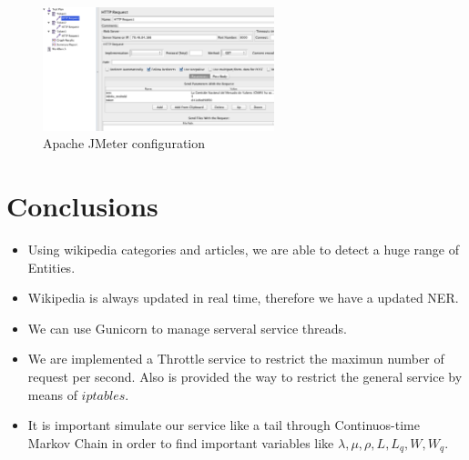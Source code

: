 \documentclass[a4paper,11pt]{article}
\begin{document}
\begin{figure}[htb]
\begin{center}
\includegraphics[width=0.6\textwidth]{img/jmeter_conf.pdf}
\caption{Apache JMeter configuration}
\end{center}
\end{figure}

\newpage
\section{Conclusions}
\begin{itemize}
\item Using wikipedia categories and articles, we are able to detect a huge range of Entities.
\item Wikipedia is always updated in real time, therefore we have a updated NER.
\item We can use Gunicorn to manage serveral service threads.
\item We are implemented a Throttle service to restrict the maximun number of request per second. Also is provided the way to restrict the general service by means of $iptables$.
\item It is important simulate our service like a tail through Continuos-time Markov Chain in order to find important variables like $\lambda, \mu, \rho, L, L_q, W, W_q$.
\end{itemize}


\newpage


\end{document}
